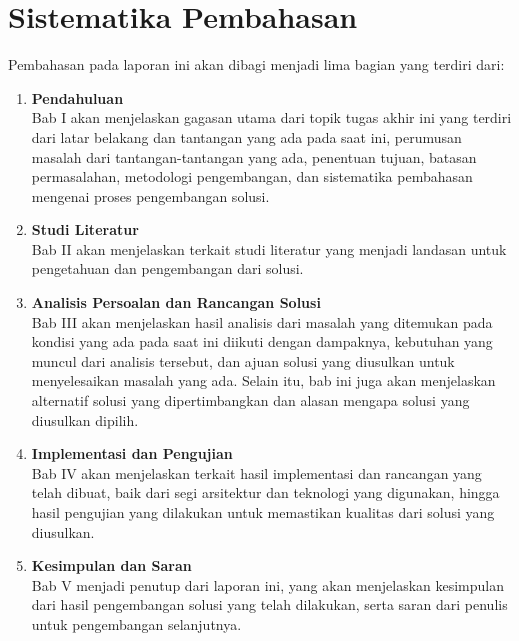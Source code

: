 \section{Sistematika Pembahasan}

Pembahasan pada laporan ini akan dibagi menjadi lima bagian yang terdiri dari:

\begin{enumerate}
	\item \textbf{Pendahuluan} \\
	      Bab I akan menjelaskan gagasan utama dari topik tugas akhir ini yang terdiri dari latar belakang dan tantangan yang ada pada saat ini, perumusan masalah dari tantangan-tantangan yang ada, penentuan tujuan, batasan permasalahan, metodologi pengembangan, dan sistematika pembahasan mengenai proses pengembangan solusi.
	\item \textbf{Studi Literatur} \\
	      Bab II akan menjelaskan terkait studi literatur yang menjadi landasan untuk pengetahuan dan pengembangan dari solusi.
	\item \textbf{Analisis Persoalan dan Rancangan Solusi} \\
	      Bab III akan menjelaskan hasil analisis dari masalah yang ditemukan pada kondisi yang ada pada saat ini diikuti dengan dampaknya, kebutuhan yang muncul dari analisis tersebut, dan ajuan solusi yang diusulkan untuk menyelesaikan masalah yang ada. Selain itu, bab ini juga akan menjelaskan alternatif solusi yang dipertimbangkan dan alasan mengapa solusi yang diusulkan dipilih.
	\item \textbf{Implementasi dan Pengujian} \\
	      Bab IV akan menjelaskan terkait hasil implementasi dan rancangan yang telah dibuat, baik dari segi arsitektur dan teknologi yang digunakan, hingga hasil pengujian yang dilakukan untuk memastikan kualitas dari solusi yang diusulkan.
	\item \textbf{Kesimpulan dan Saran} \\
	      Bab V menjadi penutup dari laporan ini, yang akan menjelaskan kesimpulan dari hasil pengembangan solusi yang telah dilakukan, serta saran dari penulis untuk pengembangan selanjutnya.
\end{enumerate}